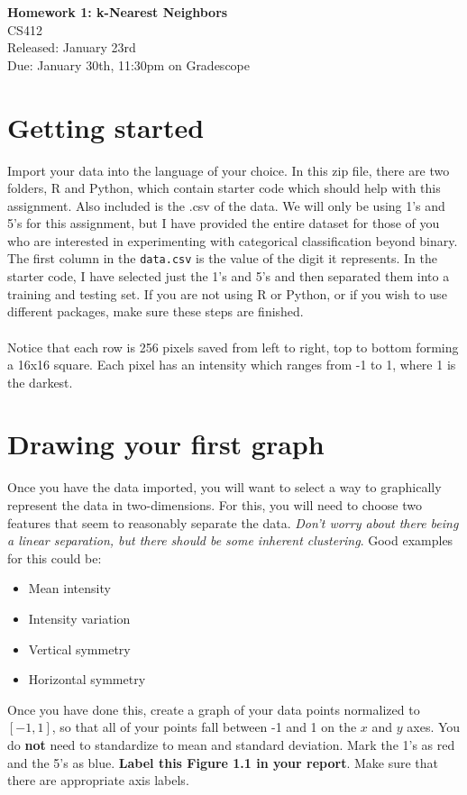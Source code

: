 \documentclass[12pt]{article}
\begin{document}
\begin{center}
\LARGE \textbf{Homework 1: k-Nearest Neighbors}\\
\large CS412\\
Released: January 23rd\\
Due: January 30th, 11:30pm on Gradescope
\end{center}

\section{Getting started}
Import your data into the language of your choice. In this zip file, there are two folders, R and Python, which contain starter code which should help with this assignment. Also included is the .csv of the data. We will only be using 1's and 5's for this assignment, but I have provided the entire dataset for those of you who are interested in experimenting with categorical classification beyond binary. The first column in the \texttt{data.csv} is the value of the digit it represents. In the starter code, I have selected just the 1's and 5's and then separated them into a training and testing set. If you are not using R or Python, or if you wish to use different packages, make sure these steps are finished.\\
\\
Notice that each row is 256 pixels saved from left to right, top to bottom forming a 16x16 square. Each pixel has an intensity which ranges from -1 to 1, where 1 is the darkest.

\section{Drawing your first graph}
Once you have the data imported, you will want to select a way to graphically represent the data in two-dimensions. For this, you will need to choose two features that seem to reasonably separate the data. \textit{Don't worry about there being a linear separation, but there should be some inherent clustering}. Good examples for this could be:
\begin{itemize}
\item Mean intensity
\item Intensity variation
\item Vertical symmetry
\item Horizontal symmetry
\end{itemize} 
Once you have done this, create a graph of your data points normalized to $[-1,1]$, so that all of your points fall between -1 and 1 on the $x$ and $y$ axes. You do \textbf{not} need to standardize to mean and standard deviation. Mark the 1's as red and the 5's as blue. \textbf{Label this Figure 1.1 in your report}. Make sure that there are appropriate axis labels.
\end{document}
